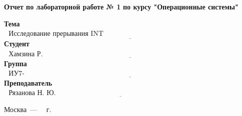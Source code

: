 \begin{titlepage}
	
	\begin{center}
		\Large\textbf{Отчет по лабораторной работе № 1}\newline
		\Large\textbf {по курсу "Операционные системы"}\newline
	\end{center}
	
	\noindent\textbf{Тема} $\underline{\text{~~Исследование прерывания INT 8h~~~~~~~~~~~~~~~~~~~~~~~~~~~~~~~~~~~~~~~~~~~~~~~~~~~~~~~~~~~~~~~~~~~~}}$\newline\newline\newline
	\noindent\textbf{Студент} $\underline{\text{~~Хамзина Р. Р.~~~~~~~~~~~~~~~~~~~~~~~~~~~~~~~~~~~~~~~~~~~~~~~~~~~~~~~~~~~~~~~~~~~~~~~~~~~~~~~~~~~~~~~~~~~}}$\newline\newline
	\noindent\textbf{Группа} $\underline{\text{~~ИУ7-53Б~~~~~~~~~~~~~~~~~~~~~~~~~~~~~~~~~~~~~~~~~~~~~~~~~~~~~~~~~~~~~~~~~~~~~~~~~~~~~~~~~~~~~~~~~~~~~~~~~~~}}$\newline\newline
	\noindent\textbf{Преподаватель} $\underline{\text{~~Рязанова Н. Ю.~~~~~~~~~~~~~~~~~~~~~~~~~~~~~~~~~~~~~~~~~~~~~~~~~~~~~~~~~~~~~~~~~~~~~~~~~~~~~~}}$\newline
	\begin{center}
		\vfill
		Москва~---~\the\year
		~г.
	\end{center}
	\restoregeometry
\end{titlepage}
